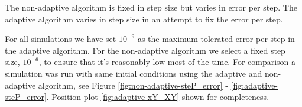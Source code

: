 The non-adaptive algorithm is fixed in step size but varies in error per step.
The adaptive algorithm varies in step size in an attempt to fix the error per step.

For all simulations we have set $10^{-9}$ as the maximum tolerated error per step in the adaptive algorithm. For the non-adaptive algorithm we select a fixed step size, $10^{-6}$, to ensure that it's reasonably low most of the time. For comparison a simulation was run with same initial conditions using the adaptive and non-adaptive algorithm, see Figure \ref{fig:non-adaptive-steP_error} - \ref{fig:adaptive-steP_error}. Position plot \ref{fig:adaptive-xY_XY} shown for completeness.

\begin{figure}
    \centering
\end{figure}
